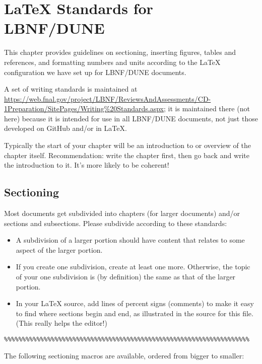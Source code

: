 
\chapter{\LaTeX{} Standards for LBNF/DUNE }
\label{ch:latex-stds}

This chapter provides guidelines on sectioning,  inserting figures, tables and references, and formatting numbers and units according to the \LaTeX{} configuration we have set up for LBNF/DUNE documents.

A set of writing standards is maintained at \url{https://web.fnal.gov/project/LBNF/ReviewsAndAssessments/CD-1Preparation/SitePages/Writing%20Standards.aspx};
it is maintained there (not here) because it is intended for use in all LBNF/DUNE documents, not just those developed on GitHub and/or in \LaTeX{}.

Typically the start of your chapter will be an introduction to or overview of the chapter itself. Recommendation: write the chapter first, then go back and write the introduction to it. It's more likely to be coherent!

\section{Sectioning}
\label{sec:sectioning}

Most documents get subdivided into chapters (for larger documents) and/or sections and subsections. Please subdivide according to these standards:

\begin{itemize}
\item A subdivision of a larger portion should have content that relates to some aspect of the larger portion. 
\item  If you create one subdivision, create at least one more. Otherwise, the topic of your one subdivision is (by definition) the same as that of the larger portion.
\item In your \LaTeX{} source, add lines of percent signs (comments) to make it easy to find where sections begin and end, as illustrated in the source for this file. (This really helps the editor!)
\end{itemize}

\begin{verbatim}
%%%%%%%%%%%%%%%%%%%%%%%%%%%%%%%%%%%%%%%%%%%%%%%%%%%%%%%%%%%%%%%%%%%%
\end{verbatim}

The following sectioning macros are available, ordered from bigger to smaller:

